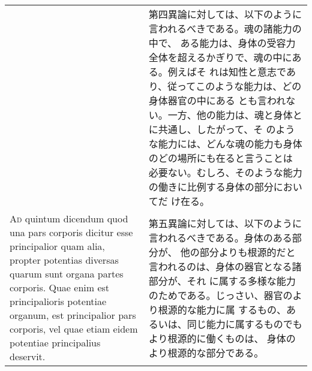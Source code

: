\documentclass[paper=a4paper,fontsize=10pt,jafontsize=9pt,titlepage]{jlreq}
\begin{document}
\begin{longtable}{p{21em}p{21em}}
 &

 第四異論に対しては、以下のように言われるべきである。魂の諸能力の中で、
 ある能力は、身体の受容力全体を超えるかぎりで、魂の中にある。例えばそ
 れは知性と意志であり、従ってこのような能力は、どの身体器官の中にある
 とも言われない。一方、他の能力は、魂と身体とに共通し、したがって、そ
 のような能力には、どんな魂の能力も身体のどの場所にも在ると言うことは
 必要ない。むしろ、そのような能力の働きに比例する身体の部分においてだ
 け在る。

\\



 {\scshape Ad} quintum dicendum quod una pars corporis dicitur esse
 principalior quam alia, propter potentias diversas quarum sunt organa
 partes corporis. Quae enim est principalioris potentiae organum, est
 principalior pars corporis, vel quae etiam eidem potentiae
 principalius deservit.

 &

 第五異論に対しては、以下のように言われるべきである。身体のある部分が、
 他の部分よりも根源的だと言われるのは、身体の器官となる諸部分が、それ
 に属する多様な能力のためである。じっさい、器官のより根源的な能力に属
 するもの、あるいは、同じ能力に属するものでもより根源的に働くものは、
 身体のより根源的な部分である。

\\

 
\end{longtable}
\end{document}
